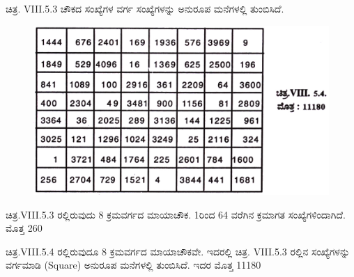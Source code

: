 ಚಿತ್ರ. VIII.5.3 ಚೌಕದ ಸಂಖ್ಯೆಗಳ ವರ್ಗ ಸಂಖ್ಯೆಗಳನ್ನು ಅನುರೂಪ ಮನೆಗಳಲ್ಲಿ \break ತುಂಬಿಸಿದೆ.
\begin{figure}[H]
\includegraphics[scale=1.1]{src/figures/chap7/fig7-18.jpg}
\end{figure}

ಚಿತ್ರ.VIII.5.3 ರಲ್ಲಿರುವುದು 8 ಕ್ರಮವರ್ಗದ ಮಾಯಾಚೌಕ. 1ರಿಂದ 64 ವರೆಗಿನ ಕ್ರಮಾಗತ ಸಂಖ್ಯೆಗಳಿಂದಾಗಿದೆ. ಮೊತ್ತ 260

ಚಿತ್ರ.VIII.5.4 ರಲ್ಲಿರುವುದೂ 8 ಕ್ರಮವರ್ಗದ ಮಾಯಾಚೌಕವೇ. ಇದರಲ್ಲಿ ಚಿತ್ರ. VIII.5.3 ರಲ್ಲಿನ ಸಂಖ್ಯೆಗಳನ್ನು ವರ್ಗಮಾಡಿ (Square) ಅನುರೂಪ ಮನೆಗಳಲ್ಲಿ ತುಂಬಿ\break ಸಿದೆ. ಇದರ ಮೊತ್ತ 11180

